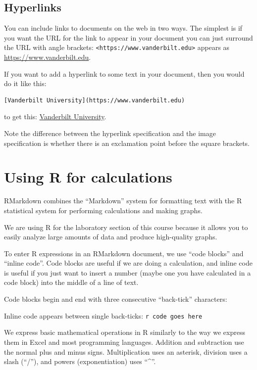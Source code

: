 \documentclass[
]{article}
\begin{document}
\hypertarget{hyperlinks}{%
\subsection{Hyperlinks}\label{hyperlinks}}

You can include links to documents on the web in two ways. The simplest
is if you want the URL for the link to appear in your document you can
just surround the URL with angle brackets:
\texttt{\textless{}https://www.vanderbilt.edu\textgreater{}} appears as
\url{https://www.vanderbilt.edu}.

If you want to add a hyperlink to some text in your document, then you
would do it like this:

\begin{verbatim}
[Vanderbilt University](https://www.vanderbilt.edu)
\end{verbatim}

to get this: \href{https://www.vanderbilt.edu}{Vanderbilt University}.

Note the difference between the hyperlink specification and the image
specification is whether there is an exclamation point before the square
brackets.

\hypertarget{using-r-for-calculations}{%
\section{Using R for calculations}\label{using-r-for-calculations}}

RMarkdown combines the ``Markdown'' system for formatting text with the
R statistical system for performing calculations and making graphs.

We are using R for the laboratory section of this course because it
allows you to easily analyze large amounts of data and produce
high-quality graphs.

To enter R expressions in an RMarkdown document, we use ``code blocks''
and ``inline code''. Code blocks are useful if we are doing a
calculation, and inline code is useful if you just want to insert a
number (maybe one you have calculated in a code block) into the middle
of a line of text.

Code blocks begin and end with three consecutive ``back-tick''
characters:

Inline code appears between single back-ticks:
\texttt{\textasciigrave{}r\ code\ goes\ here\textasciigrave{}}

We express basic mathematical operations in R similarly to the way we
express them in Excel and most programming languages. Addition and
subtraction use the normal plus and minus signs. Multiplication uses an
asterisk, division uses a slash (``/''), and powers (exponentiation)
uses ``\^{}''.
\end{document}
